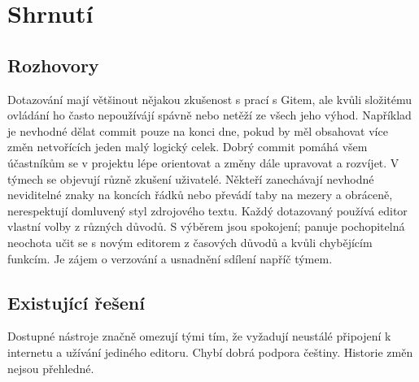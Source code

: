 \section{Shrnutí}

\subsection{Rozhovory}

Dotazování mají většinout nějakou zkušenost s prací s Gitem, ale kvůli složitému ovládání ho často nepoužívájí spávně nebo netěží ze všech jeho výhod. Například je nevhodné dělat commit pouze na konci dne, pokud by měl obsahovat více změn netvořících jeden malý logický celek. Dobrý commit pomáhá všem účastníkům se v projektu lépe orientovat a změny dále upravovat a rozvíjet. V týmech se objevují různě zkušení uživatelé. Někteří zanechávají nevhodné neviditelné znaky na koncích řádků nebo převádí taby na mezery a obráceně, nerespektují domluvený styl zdrojového textu. Každý dotazovaný používá editor vlastní volby z různých důvodů. S výběrem jsou spokojení; panuje pochopitelná neochota učit se s novým editorem z časových důvodů a kvůli chybějícím funkcím. Je zájem o verzování a usnadnění sdílení napříč týmem.

\subsection{Existující řešení}

Dostupné nástroje značně omezují tými tím, že vyžadují neustálé připojení k internetu a užívání jediného editoru. Chybí dobrá podpora češtiny. Historie změn nejsou přehledné.